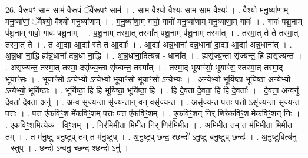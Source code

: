 \documentclass[17pt]{extarticle}
\begin{document}
26. वै॒रू॒पꣳ साम॒ साम॑ वैरू॒पं ॅवै॑रू॒पꣳ साम॑ । . साम॒ वैश्यो॒ वैश्यः॒ साम॒ साम॒ वैश्यः॑ । . वैश्यो॑ मनु॒ष्या॑णाम् मनु॒ष्या॑णां॒ ॅवैश्यो॒ वैश्यो॑ मनु॒ष्या॑णाम् । . म॒नु॒ष्या॑णा॒म् गावो॒ गावो॑ मनु॒ष्या॑णाम् मनु॒ष्या॑णा॒म् गावः॑ । . गावः॑ पशू॒नाम् प॑शू॒नाम् गावो॒ गावः॑ पशू॒नाम् । . प॒शू॒नाम् तस्मा॒त् तस्मा᳚त् पशू॒नाम् प॑शू॒नाम् तस्मा᳚त् । . तस्मा॒त् ते ते तस्मा॒त् तस्मा॒त् ते । . त आ॒द्या॑ आ॒द्या᳚ स्ते त आ॒द्याः᳚ । . आ॒द्या॑ अन्न॒धाना॑ दन्न॒धाना॑ दा॒द्या॑ आ॒द्या॑ अन्न॒धाना᳚त् । . अ॒न्न॒धा ना॒द्धि ह्य॑न्न॒धाना॑ दन्न॒धा ना॒द्धि । . अ॒न्न॒धाना॒दित्य॑न्न - धाना᳚त् । . ह्यसृ॑ज्य॒न्ता सृ॑ज्यन्त॒ हि ह्यसृ॑ज्यन्त । . असृ॑ज्यन्त॒ तस्मा॒त् तस्मा॒ दसृ॑ज्य॒न्ता सृ॑ज्यन्त॒ तस्मा᳚त् । . तस्मा॒द् भूयाꣳ॑सो॒ भूयाꣳ॑स॒ स्तस्मा॒त् तस्मा॒द् भूयाꣳ॑सः । . भूयाꣳ॑सो॒ ऽन्येभ्यो॒ ऽन्येभ्यो॒ भूयाꣳ॑सो॒ भूयाꣳ॑सो॒ ऽन्येभ्यः॑ । . अ॒न्येभ्यो॒ भूयि॑ष्ठा॒ भूयि॑ष्ठा अ॒न्येभ्यो॒ ऽन्येभ्यो॒ भूयि॑ष्ठाः । . भूयि॑ष्ठा॒ हि हि भूयि॑ष्ठा॒ भूयि॑ष्ठा॒ हि । . हि दे॒वता॑ दे॒वता॒ हि हि दे॒वताः᳚ । . दे॒वता॒ अन्वनु॑ दे॒वता॑ दे॒वता॒ अनु॑ । . अन्व सृ॑ज्य॒न्ता सृ॑ज्य॒न्तान् वन् वसृ॑ज्यन्त । . असृ॑ज्यन्त प॒त्तः प॒त्तो ऽसृ॑ज्य॒न्ता सृ॑ज्यन्त प॒त्तः । . प॒त्त ए॑कविꣳ॒॒श मे॑कविꣳ॒॒शम् प॒त्तः प॒त्त ए॑कविꣳ॒॒शम् । . ए॒क॒विꣳ॒॒शन् निर् णिरे॑कविꣳ॒॒श मे॑कविꣳ॒॒शन् निः । . ए॒क॒विꣳ॒॒शमित्ये॑क - विꣳ॒॒शम् । . निर॑मिमीता मिमीत॒ निर् णिर॑मिमीत । . अ॒मि॒मी॒त॒ तम् त म॑मिमीता मिमीत॒ तम् । . त म॑नु॒ष्टु ब॑नु॒ष्टुप् तम् त म॑नु॒ष्टुप् । . अ॒नु॒ष्टुप् छन्द॒ श्छन्दो॑ ऽनु॒ष्टु ब॑नु॒ष्टुप् छन्दः॑ । . अ॒नु॒ष्टुबित्य॑नु - स्तुप् । . छन्दो ऽन्वनु॒ च्छन्द॒ श्छन्दो ऽनु॑ । \newline
\end{document}
